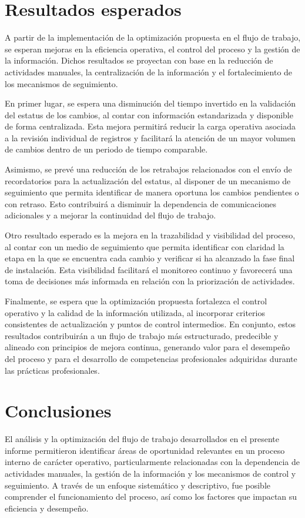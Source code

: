 \documentclass[12pt]{article}
\begin{document}
\section*{Resultados esperados}
A partir de la implementación de la optimización propuesta en el flujo de trabajo, se esperan mejoras en la eficiencia operativa, el control del proceso y la gestión de la información. Dichos resultados se proyectan con base en la reducción de actividades manuales, la centralización de la información y el fortalecimiento de los mecanismos de seguimiento.

En primer lugar, se espera una disminución del tiempo invertido en la validación del estatus de los cambios, al contar con información estandarizada y disponible de forma centralizada. Esta mejora permitirá reducir la carga operativa asociada a la revisión individual de registros y facilitará la atención de un mayor volumen de cambios dentro de un periodo de tiempo comparable.

Asimismo, se prevé una reducción de los retrabajos relacionados con el envío de recordatorios para la actualización del estatus, al disponer de un mecanismo de seguimiento que permita identificar de manera oportuna los cambios pendientes o con retraso. Esto contribuirá a disminuir la dependencia de comunicaciones adicionales y a mejorar la continuidad del flujo de trabajo.

Otro resultado esperado es la mejora en la trazabilidad y visibilidad del proceso, al contar con un medio de seguimiento que permita identificar con claridad la etapa en la que se encuentra cada cambio y verificar si ha alcanzado la fase final de instalación. Esta visibilidad facilitará el monitoreo continuo y favorecerá una toma de decisiones más informada en relación con la priorización de actividades.

Finalmente, se espera que la optimización propuesta fortalezca el control operativo y la calidad de la información utilizada, al incorporar criterios consistentes de actualización y puntos de control intermedios. En conjunto, estos resultados contribuirán a un flujo de trabajo más estructurado, predecible y alineado con principios de mejora continua, generando valor para el desempeño del proceso y para el desarrollo de competencias profesionales adquiridas durante las prácticas profesionales.


\section*{Conclusiones}
El análisis y la optimización del flujo de trabajo desarrollados en el presente informe permitieron identificar áreas de oportunidad relevantes en un proceso interno de carácter operativo, particularmente relacionadas con la dependencia de actividades manuales, la gestión de la información y los mecanismos de control y seguimiento. A través de un enfoque sistemático y descriptivo, fue posible comprender el funcionamiento del proceso, así como los factores que impactan su eficiencia y desempeño.
\end{document}
